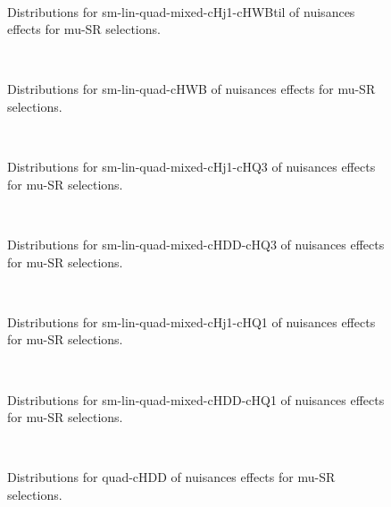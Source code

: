 \begin{figure}[htbp]  
\centering 
\\ 
\caption{ 
   Distributions for sm-lin-quad-mixed-cHj1-cHWBtil of nuisances effects for mu-SR selections.
} 
\label{fig:sm_lin_quad_mixed_cHj1_cHWBtil_mu_SR} 
\end{figure} 




\begin{figure}[htbp]  
\centering 
\\ 
\caption{ 
   Distributions for sm-lin-quad-cHWB of nuisances effects for mu-SR selections.
} 
\label{fig:sm_lin_quad_cHWB_mu_SR} 
\end{figure} 




\begin{figure}[htbp]  
\centering 
\\ 
\caption{ 
   Distributions for sm-lin-quad-mixed-cHj1-cHQ3 of nuisances effects for mu-SR selections.
} 
\label{fig:sm_lin_quad_mixed_cHj1_cHQ3_mu_SR} 
\end{figure} 




\begin{figure}[htbp]  
\centering 
\\ 
\caption{ 
   Distributions for sm-lin-quad-mixed-cHDD-cHQ3 of nuisances effects for mu-SR selections.
} 
\label{fig:sm_lin_quad_mixed_cHDD_cHQ3_mu_SR} 
\end{figure} 




\begin{figure}[htbp]  
\centering 
\\ 
\caption{ 
   Distributions for sm-lin-quad-mixed-cHj1-cHQ1 of nuisances effects for mu-SR selections.
} 
\label{fig:sm_lin_quad_mixed_cHj1_cHQ1_mu_SR} 
\end{figure} 




\begin{figure}[htbp]  
\centering 
\\ 
\caption{ 
   Distributions for sm-lin-quad-mixed-cHDD-cHQ1 of nuisances effects for mu-SR selections.
} 
\label{fig:sm_lin_quad_mixed_cHDD_cHQ1_mu_SR} 
\end{figure} 




\begin{figure}[htbp]  
\centering 
\\ 
\caption{ 
   Distributions for quad-cHDD of nuisances effects for mu-SR selections.
} 
\label{fig:quad_cHDD_mu_SR} 
\end{figure} 




